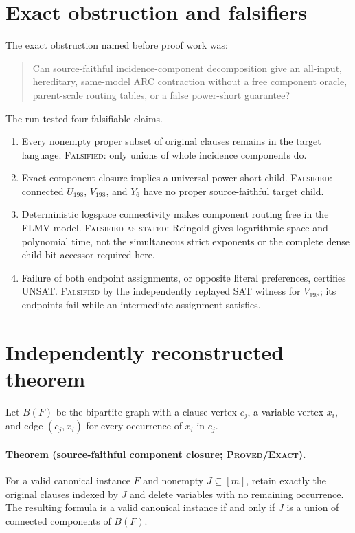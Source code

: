 \documentclass[11pt]{article}
\newcommand{\Status}[1]{\textsc{#1}}
\begin{document}
\section{Exact obstruction and falsifiers}
The exact obstruction named before proof work was:
\begin{quote}
Can source-faithful incidence-component decomposition give an all-input,
hereditary, same-model ARC contraction without a free component oracle,
parent-scale routing tables, or a false power-short guarantee?
\end{quote}
The run tested four falsifiable claims.
\begin{enumerate}
  \item Every nonempty proper subset of original clauses remains in the target
  language.  \Status{Falsified}: only unions of whole incidence components do.
  \item Exact component closure implies a universal power-short child.
  \Status{Falsified}: connected $U_{198}$, $V_{198}$, and $Y_6$ have no proper
  source-faithful target child.
  \item Deterministic logspace connectivity makes component routing free in the
  FLMV model.  \Status{Falsified as stated}: Reingold gives logarithmic space
  and polynomial time, not the simultaneous strict exponents or the complete
  dense child-bit accessor required here.
  \item Failure of both endpoint assignments, or opposite literal preferences,
  certifies UNSAT.  \Status{Falsified} by the independently replayed SAT witness
  for $V_{198}$; its endpoints fail while an intermediate assignment satisfies.
\end{enumerate}

\section{Independently reconstructed theorem}
Let $B(F)$ be the bipartite graph with a clause vertex $c_j$, a variable vertex
$x_i$, and edge $(c_j,x_i)$ for every occurrence of $x_i$ in $c_j$.

\paragraph{Theorem (source-faithful component closure; \Status{Proved/Exact}).}
For a valid canonical instance $F$ and nonempty $J\subseteq[m]$, retain exactly
the original clauses indexed by $J$ and delete variables with no remaining
occurrence.  The resulting formula is a valid canonical instance if and only if
$J$ is a union of connected components of $B(F)$.
\end{document}
